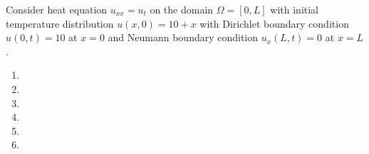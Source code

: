 Consider heat equation $u_{xx} = u_t$ on the domain $\Omega = [0, L]$ with initial temperature distribution 
$u(x, 0) = 10 + x$ with Dirichlet boundary condition $u(0, t) = 10$ at $x = 0$ and Neumann boundary condition 
$u_x(L, t) = 0$ at $x = L$.

\begin{enumerate}
  \item 
  \pagebreak
  \item 
  \pagebreak
  \item 
  \pagebreak
  \item 
  \pagebreak
  \item 
  \pagebreak
  \item 
\end{enumerate} 